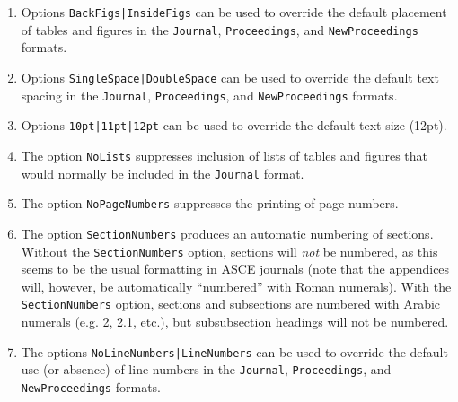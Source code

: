 \documentclass[Journal,letterpaper]{ascelike-new}
\begin{document}
\begin{enumerate}
%
\item
Options \verb+BackFigs|InsideFigs+ can be used to override 
the default placement of tables
and figures in the \texttt{Journal}, \texttt{Proceedings}, and
\texttt{NewProceed\-ings} formats.
\item
Options \verb+SingleSpace|DoubleSpace+ can be used to override 
the default text spacing in the 
\texttt{Journal}, \texttt{Proceedings}, and
\texttt{NewProceedings} formats.
\item
Options \verb+10pt|11pt|12pt+ can be used to override the 
default text size (12pt).
\item
The option \texttt{NoLists} suppresses inclusion of lists of tables
and figures that would normally be included in the \texttt{Journal}
format.
\item
The option \texttt{NoPageNumbers} suppresses the printing of page numbers.
\item
The option \texttt{SectionNumbers} produces an automatic numbering of sections.
Without the \texttt{SectionNumbers} option, sections will \emph{not} be
numbered, as this seems to be the usual formatting in ASCE journals 
(note that the appendices will, however, be automatically
``numbered'' with Roman numerals).  
With the \texttt{SectionNumbers} option, sections and
subsections are numbered with Arabic numerals (e.g. 2, 2.1, etc.), but
subsubsection headings will not be numbered.  
\item
The options \verb+NoLineNumbers|LineNumbers+ can be used to override
the default use (or absence) of line numbers in the \texttt{Journal},
\texttt{Proceedings}, and
\texttt{NewProceedings} formats.
\end{enumerate}

%
%

%
\end{document}
